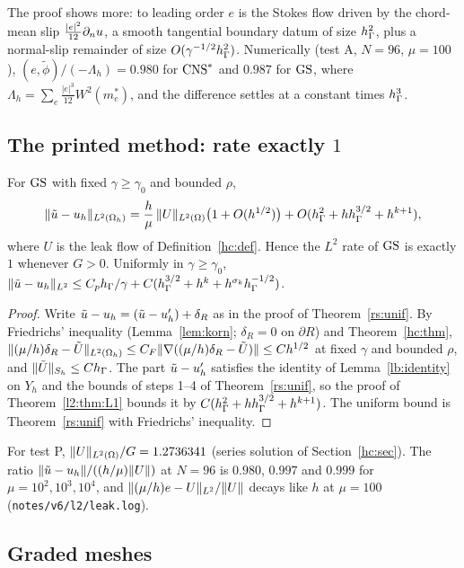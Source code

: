 The proof shows more: to leading order $e$ is the Stokes flow driven by the chord-mean slip $\frac{|e|^2}{12}\partial_n u$, a smooth tangential boundary datum of size $h_\Gamma^2$, plus a normal-slip remainder of size $O(\gamma^{-1/2}h_\Gamma^2)$. Numerically (test A, $N=96$, $\mu=100$), $(e,\tilde\phi)/(-\Lambda_h)=0.980$ for $\mathrm{CNS}^\ast$ and $0.987$ for $\GS$, where $\Lambda_h=\sum_e\frac{|e|^3}{12}W^2(m_e^\ast)$, and the difference settles at a constant times $h_\Gamma^3$.

\subsection{The printed method: rate exactly \texorpdfstring{$1$}{1}}

\begin{theorem}[$L^2$ error of $\GS$]\label{l2:thm:L2}
For $\GS$ with fixed $\gamma\ge\gamma_0$ and bounded $\rho$,
\[
\lVert \tilde u-u_h\rVert_{L^2(\Omega_h)}=\frac h\mu\,\lVert U\rVert_{L^2(\Omega)}\bigl(1+O(h^{1/2})\bigr)+O(h_\Gamma^2+hh_\Gamma^{3/2}+h^{k+1}),
\]
where $U$ is the leak flow of Definition~\ref{hc:def}. Hence the $L^2$ rate of $\GS$ is exactly $1$ whenever $G>0$. Uniformly in $\gamma\ge\gamma_0$, $\lVert \tilde u-u_h\rVert_{L^2}\le C_ph_\Gamma/\gamma+C(h_\Gamma^{3/2}+h^k+h^{\sigma_k}h_\Gamma^{-1/2})$.
\end{theorem}

\begin{proof}
Write $\tilde u-u_h=(\tilde u-u_h')+\delta_R$ as in the proof of Theorem~\ref{rs:unif}. By Friedrichs' inequality (Lemma~\ref{lem:korn}; $\delta_R=0$ on $\partial R$) and Theorem~\ref{hc:thm}, $\lVert (\mu/h)\delta_R-\tilde U\rVert_{L^2(\Omega_h)}\le C_F\lVert \nabla((\mu/h)\delta_R-\tilde U)\rVert\le Ch^{1/2}$ at fixed $\gamma$ and bounded $\rho$, and $\lVert \tilde U\rVert_{S_h}\le Ch_\Gamma$. The part $\tilde u-u_h'$ satisfies the identity of Lemma~\ref{lb:identity} on $Y_h$ and the bounds of steps 1--4 of Theorem~\ref{rs:unif}, so the proof of Theorem~\ref{l2:thm:L1} bounds it by $C(h_\Gamma^2+hh_\Gamma^{3/2}+h^{k+1})$. The uniform bound is Theorem~\ref{rs:unif} with Friedrichs' inequality.
\end{proof}

For test P, $\lVert U\rVert_{L^2(\Omega)}/G=1.2736341$ (series solution of Section~\ref{hc:sec}). The ratio $\lVert \tilde u-u_h\rVert/((h/\mu)\lVert U\rVert)$ at $N=96$ is $0.980$, $0.997$ and $0.999$ for $\mu=10^2,10^3,10^4$, and $\lVert (\mu/h)e-U\rVert_{L^2}/\lVert U\rVert$ decays like $h$ at $\mu=100$ (\texttt{notes/v6/l2/leak.log}).

\subsection{Graded meshes}\label{l2:sec:graded}

